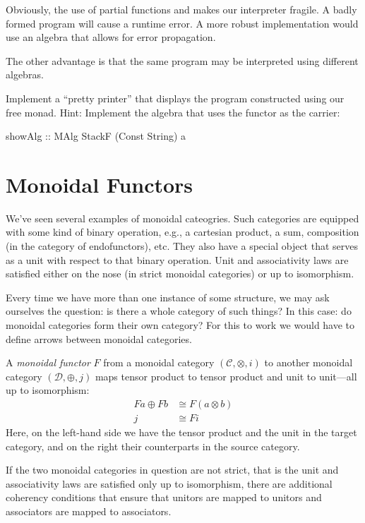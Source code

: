 \documentclass[DaoFP]{subfiles}
\begin{document}
Obviously, the use of partial functions  and  makes our interpreter fragile. A badly formed program will cause a runtime error. A more robust implementation would use an algebra that allows for error propagation.

The other advantage is that the same program may be interpreted using different algebras.

\begin{exercise}
Implement a ``pretty printer'' that displays the program constructed using our free monad. Hint: Implement the algebra that uses the  functor as the carrier:
\begin{haskell}
showAlg :: MAlg StackF (Const String) a
\end{haskell}
\end{exercise}

\section{Monoidal Functors}

We've seen several examples of monoidal cateogries. Such categories are equipped with some kind of binary operation, e.g., a cartesian product, a sum, composition (in the category of endofunctors), etc. They also have a special object that serves as a unit with respect to that binary operation. Unit and associativity laws are satisfied either on the nose (in strict monoidal categories) or up to isomorphism.

Every time we have more than one instance of some structure, we may ask ourselves the question: is there a whole category of such things? In this case: do monoidal categories form their own category? For this to work we would have to define arrows between monoidal categories.

A \emph{monoidal functor} $F$ from a monoidal category $(\mathcal{C}, \otimes, i)$ to another monoidal category $(\mathcal{D}, \oplus, j)$ maps tensor product to tensor product and unit to unit---all up to isomorphism:
\begin{align*}
F a \oplus F b &\cong F (a \otimes b) \\
j &\cong F i 
\end{align*}
Here, on the left-hand side we have the tensor product and the unit in the target category, and on the right their counterparts in the source category. 

If the two monoidal categories in question are not strict, that is the unit and associativity laws are satisfied only up to isomorphism, there are additional coherency conditions that ensure that unitors are mapped to unitors and associators are mapped to associators.
\end{document}
